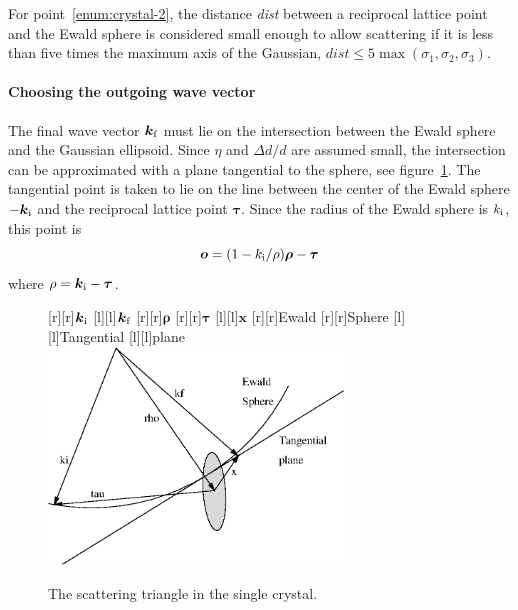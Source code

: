 For point~\ref{enum:crystal-2}, the distance
\textit{dist} between a reciprocal lattice point and the Ewald sphere is
considered small enough to allow scattering if it is less than five
times the maximum axis of the Gaussian, $\textit{dist} \leq
5\max(\sigma_1,\sigma_2,\sigma_3)$.

\paragraph{Choosing the outgoing wave vector}

The final wave vector $\boldsymbol{k}_{\rm f}$ must lie on the
intersection between the Ewald sphere and the Gaussian ellipsoid. Since
$\eta$ and $\Delta d/d$ are assumed small, the intersection can be
approximated with a plane tangential to the sphere, see
figure~\ref{fig:crystal-scattering-tri}. The tangential point is taken
to lie on the line between the center of the Ewald sphere
$-\boldsymbol{k}_{\rm i}$ and the reciprocal lattice point
$\boldsymbol{\tau}$. Since the radius of the Ewald sphere is $k_{\rm
  i}$, this point is
$$ \boldsymbol{o}=(1 - k_{\rm i}/\rho)\boldsymbol{\rho} - \boldsymbol{\tau} $$
where $\rho = \boldsymbol{k}_{\rm i} - \boldsymbol{\tau}$.
\begin{figure}[t]
  \begin{center}
    [r][r]{$\boldsymbol{k}_{\rm i}$}
    [l][l]{$\boldsymbol{k}_{\rm f}$}
    [r][r]{$\boldsymbol{\rho}$}
    [r][r]{$\boldsymbol{\tau}$}
    [l][l]{$\boldsymbol{x}$}
    [r][r]{Ewald}
    [r][r]{Sphere}
    [l][l]{Tangential}
    [l][l]{plane}
    \includegraphics[width=0.7\textwidth]{figures/recip-detail.eps}
  \end{center}
\caption{The scattering triangle in the single crystal.}
\label{fig:crystal-scattering-tri}
\end{figure}

